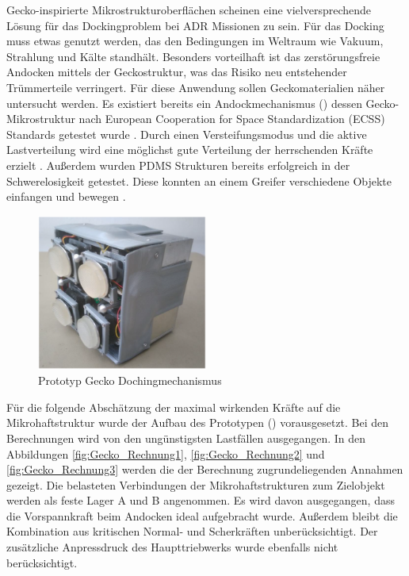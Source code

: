 Gecko-inspirierte Mikrostrukturoberflächen scheinen eine vielversprechende Lösung für das Dockingproblem bei ADR Missionen zu sein. Für das Docking muss etwas genutzt werden, das den Bedingungen im Weltraum wie Vakuum, Strahlung und Kälte standhält. Besonders vorteilhaft ist das zerstörungsfreie Andocken mittels der Geckostruktur, was das Risiko neu entstehender Trümmerteile verringert. Für diese Anwendung sollen Geckomaterialien näher untersucht werden. Es existiert bereits ein Andockmechanismus () dessen Gecko-Mikrostruktur nach  European Cooperation for Space Standardization (ECSS) Standards getestet wurde \cite[Seite 10]{ChristopherTrentlage.2018}. Durch einen Versteifungsmodus und die aktive Lastverteilung wird eine möglichst gute Verteilung der herrschenden Kräfte erzielt \cite{ChristopherTrentlage.2018}. Außerdem wurden PDMS Strukturen bereits erfolgreich in der Schwerelosigkeit getestet. Diese konnten an einem Greifer verschiedene Objekte einfangen und bewegen \cite{Schwerter.}.



\begin{figure}[H]
	\centering
		\includegraphics[width=0.50\textwidth]{graphics/Gecko3.PNG}
	\caption{Prototyp Gecko Dochingmechanismus \cite[Figure 18, Seite 10]{Trentlage.}}
	\label{fig:Gecko3}
\end{figure}



Für die folgende Abschätzung der maximal wirkenden Kräfte auf die Mikrohaftstruktur wurde der Aufbau des Prototypen () vorausgesetzt. Bei den Berechnungen wird von den ungünstigsten Lastfällen ausgegangen.
In den Abbildungen \ref{fig:Gecko_Rechnung1}, \ref{fig:Gecko_Rechnung2} und \ref{fig:Gecko_Rechnung3} werden die der Berechnung zugrundeliegenden Annahmen gezeigt. Die belasteten Verbindungen der Mikrohaftstrukturen zum Zielobjekt werden als feste Lager A und B angenommen. Es wird davon ausgegangen, dass die Vorspannkraft beim Andocken ideal aufgebracht wurde. Außerdem bleibt die Kombination aus kritischen Normal- und Scherkräften unberücksichtigt. Der zusätzliche Anpressdruck des Haupttriebwerks wurde ebenfalls nicht berücksichtigt.

